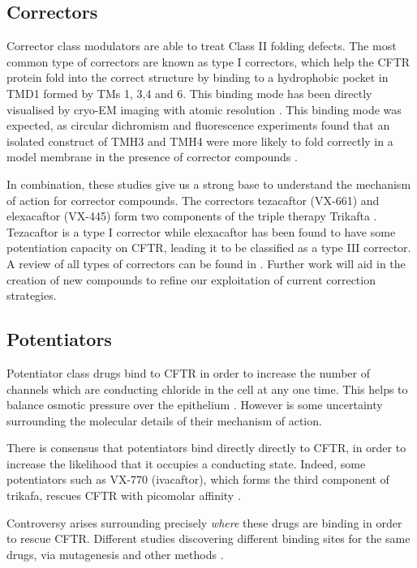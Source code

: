 \subsection{Correctors}
Corrector class modulators are able to treat Class II folding defects. The most common type of correctors are known as type I correctors, which help the CFTR protein fold into the correct structure by binding to a hydrophobic pocket in TMD1 formed by TMs 1, 3,4 and 6. This binding mode has been directly visualised by cryo-EM imaging with atomic resolution \cite{fiedorczuk2022}. This binding mode was expected, as circular dichromism \cite{greenfield2006} and fluorescence experiments found that an isolated construct of TMH3 and TMH4 were more likely to fold correctly in a model membrane in the presence of corrector compounds \cite{krainer2018}. 

In combination, these studies give us a strong base to understand the mechanism of action for corrector compounds. The correctors tezacaftor (VX-661) and elexacaftor (VX-445) form two components of the triple therapy Trikafta \cite{administration2021, trikafta_website}. Tezacaftor is a type I corrector while elexacaftor has been found to have some potentiation capacity on CFTR, leading it to be classified as a type III corrector. A review of all types of correctors can be found in \cite{veit2018}. Further work will aid in the creation of new compounds to refine our exploitation of current correction strategies.

\subsection{Potentiators}
Potentiator class drugs bind to CFTR in order to increase the number of channels which are conducting chloride in the cell at any one time. This helps to balance osmotic pressure over the epithelium \cite{jih2013,yeh2017}. However is some uncertainty surrounding the molecular details of their mechanism of action. 

There is consensus that potentiators bind directly directly to CFTR, in order to increase the likelihood that it occupies a conducting state. Indeed, some potentiators such as VX-770 (ivacaftor), which forms the third component of trikafa, rescues CFTR with picomolar affinity \cite{csanady2019}. 

Controversy arises surrounding precisely \textit{where} these drugs are binding in order to rescue CFTR. Different studies discovering different binding sites for the same drugs, via mutagenesis and other methods \cite{yeh2019, liu2019, laselva2021}.  

